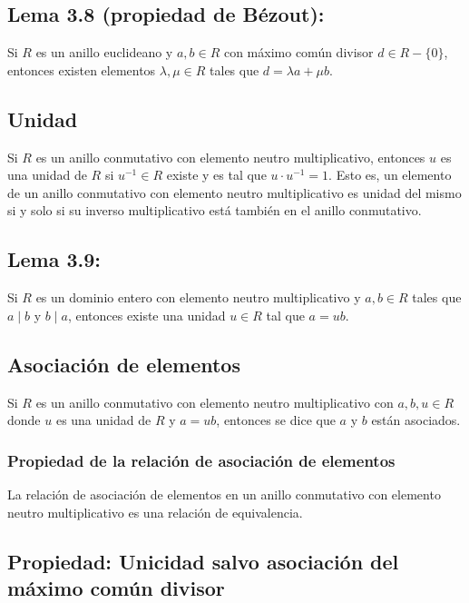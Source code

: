 \documentclass{article}
\begin{document}
\subsection*{\color{blue} Lema 3.8 (propiedad de Bézout):}

Si $R$ es un anillo euclideano y $a,b\in R$ con máximo común divisor $d\in R-\{0\}$, entonces existen elementos $\lambda,\mu\in R$ tales que $d=\lambda a+\mu b$.

\subsection*{\color{violet} Unidad}

Si $R$ es un anillo conmutativo con elemento neutro multiplicativo, entonces $u$ es una unidad de $R$ si $u^{-1}\in R$ existe y es tal que $u\cdot u^{-1}=1$. Esto es, un elemento de un anillo conmutativo con elemento neutro multiplicativo es unidad del mismo si y solo si su inverso multiplicativo está también en el anillo conmutativo.

\subsection*{\color{blue} Lema 3.9:}

Si $R$ es un dominio entero con elemento neutro multiplicativo y $a,b\in R$ tales que $a\mid b$ y $b\mid a$, entonces existe una unidad $u\in R$ tal que $a=ub$.

\subsection*{\color{violet} Asociación de elementos}

Si $R$ es un anillo conmutativo con elemento neutro multiplicativo con $a,b,u\in R$ donde $u$ es una unidad de $R$ y $a=ub$, entonces se dice que $a$ y $b$ están asociados.

\subsubsection*{\color{teal} Propiedad de la relación de asociación de elementos}

La relación de asociación de elementos en un anillo conmutativo con elemento neutro multiplicativo es una relación de equivalencia.

\subsection*{\color{purple} Propiedad: Unicidad salvo asociación del máximo común divisor}
\end{document}

